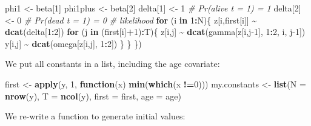 \documentclass[
  12pt,
]{krantz}
\newenvironment{Shaded}{\begin{snugshade}}{\end{snugshade}}
\newcommand{\AttributeTok}[1]{\textcolor[rgb]{0.13,0.29,0.53}{#1}}
\newcommand{\CommentTok}[1]{\textcolor[rgb]{0.56,0.35,0.01}{\textit{#1}}}
\newcommand{\ControlFlowTok}[1]{\textcolor[rgb]{0.13,0.29,0.53}{\textbf{#1}}}
\newcommand{\DecValTok}[1]{\textcolor[rgb]{0.00,0.00,0.81}{#1}}
\newcommand{\FunctionTok}[1]{\textcolor[rgb]{0.13,0.29,0.53}{\textbf{#1}}}
\newcommand{\NormalTok}[1]{#1}
\newcommand{\OtherTok}[1]{\textcolor[rgb]{0.56,0.35,0.01}{#1}}
\newcommand{\SpecialCharTok}[1]{\textcolor[rgb]{0.81,0.36,0.00}{\textbf{#1}}}
\begin{document}
\begin{Shaded}
\begin{Highlighting}[]
\NormalTok{  phi1 }\OtherTok{\textless{}{-}}\NormalTok{ beta[}\DecValTok{1}\NormalTok{]}
\NormalTok{  phi1plus }\OtherTok{\textless{}{-}}\NormalTok{ beta[}\DecValTok{2}\NormalTok{]}
\NormalTok{  delta[}\DecValTok{1}\NormalTok{] }\OtherTok{\textless{}{-}} \DecValTok{1}                     \CommentTok{\# Pr(alive t = 1) = 1}
\NormalTok{  delta[}\DecValTok{2}\NormalTok{] }\OtherTok{\textless{}{-}} \DecValTok{0}                     \CommentTok{\# Pr(dead t = 1) = 0}
  \CommentTok{\# likelihood}
  \ControlFlowTok{for}\NormalTok{ (i }\ControlFlowTok{in} \DecValTok{1}\SpecialCharTok{:}\NormalTok{N)\{}
\NormalTok{    z[i,first[i]] }\SpecialCharTok{\textasciitilde{}} \FunctionTok{dcat}\NormalTok{(delta[}\DecValTok{1}\SpecialCharTok{:}\DecValTok{2}\NormalTok{])}
    \ControlFlowTok{for}\NormalTok{ (j }\ControlFlowTok{in}\NormalTok{ (first[i]}\SpecialCharTok{+}\DecValTok{1}\NormalTok{)}\SpecialCharTok{:}\NormalTok{T)\{}
\NormalTok{      z[i,j] }\SpecialCharTok{\textasciitilde{}} \FunctionTok{dcat}\NormalTok{(gamma[z[i,j}\DecValTok{{-}1}\NormalTok{], }\DecValTok{1}\SpecialCharTok{:}\DecValTok{2}\NormalTok{, i, j}\DecValTok{{-}1}\NormalTok{])}
\NormalTok{      y[i,j] }\SpecialCharTok{\textasciitilde{}} \FunctionTok{dcat}\NormalTok{(omega[z[i,j], }\DecValTok{1}\SpecialCharTok{:}\DecValTok{2}\NormalTok{])}
\NormalTok{    \}}
\NormalTok{  \}}
\NormalTok{\})}
\end{Highlighting}
\end{Shaded}

We put all constants in a list, including the age covariate:

\begin{Shaded}
\begin{Highlighting}[]
\NormalTok{first }\OtherTok{\textless{}{-}} \FunctionTok{apply}\NormalTok{(y, }\DecValTok{1}\NormalTok{, }\ControlFlowTok{function}\NormalTok{(x) }\FunctionTok{min}\NormalTok{(}\FunctionTok{which}\NormalTok{(x }\SpecialCharTok{!=}\DecValTok{0}\NormalTok{)))}
\NormalTok{my.constants }\OtherTok{\textless{}{-}} \FunctionTok{list}\NormalTok{(}\AttributeTok{N =} \FunctionTok{nrow}\NormalTok{(y), }
                     \AttributeTok{T =} \FunctionTok{ncol}\NormalTok{(y), }
                     \AttributeTok{first =}\NormalTok{ first,}
                     \AttributeTok{age =}\NormalTok{ age)}
\end{Highlighting}
\end{Shaded}

We re-write a function to generate initial values:
\end{document}
